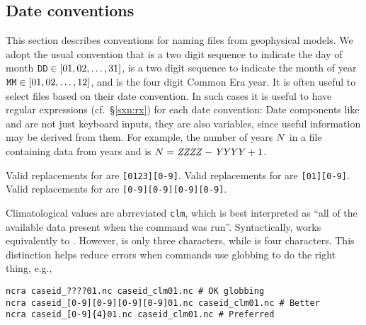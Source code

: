 \documentclass[12pt,twoside]{article}
\begin{document}
\subsection{Date conventions}\label{sxn:cnv}
This section describes conventions for naming files from geophysical
models. 
We adopt the usual convention that  is a two digit sequence
to indicate the day of month $\kbdidx{DD} \in [01, 02, \ldots, 31]$,
 is a two digit sequence to indicate the month of year 
$\kbdidx{MM} \in [01, 02, \ldots, 12]$, and  is the four
digit Common Era year.
It is often useful to select files based on their date convention.
In such cases it is useful to have regular expressions
(cf.~\S\ref{sxn:rx}) for each date convention:
Date components like  and  are not just
keyboard inputs, they are also variables, since useful information
may be derived from them. 
For example, the number of years $N$ in a file containing
data from years  and  is 
$\NNN = \mbox{\varprn{ZZZZ}}-\mbox{\varprn{YYYY}}+1$.

Valid replacements for  are \verb'[0123][0-9]'.
Valid replacements for  are \verb'[01][0-9]'.
Valid replacements for  are \verb'[0-9][0-9][0-9][0-9]'.

Climatological values are abrreviated \verb'clm', which is best
interpreted as ``all of the available data present when the command 
was run''.
Syntactically,  works equivalently to .
However,  is only three characters, while  is 
four characters.        
This distinction helps reduce errors when commands use globbing
to do the right thing, e.g.,
\begin{verbatim}
ncra caseid_????01.nc caseid_clm01.nc # OK globbing
ncra caseid_[0-9][0-9][0-9][0-9]01.nc caseid_clm01.nc # Better
ncra caseid_[0-9]{4}01.nc caseid_clm01.nc # Preferred
\end{verbatim}
\end{document}
